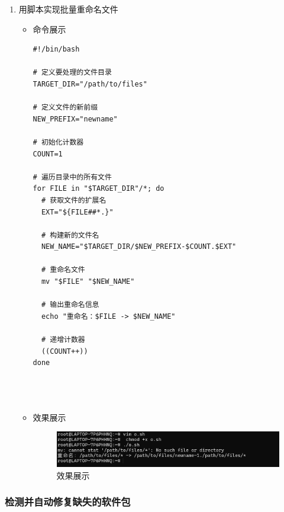 \documentclass[UTF8]{ctexart}
\begin{document}
\begin{enumerate}
  \item 用脚本实现批量重命名文件

  \begin{itemize}
  \item 命令展示
  \begin{verbatim}
#!/bin/bash

# 定义要处理的文件目录
TARGET_DIR="/path/to/files"

# 定义文件的新前缀
NEW_PREFIX="newname"

# 初始化计数器
COUNT=1

# 遍历目录中的所有文件
for FILE in "$TARGET_DIR"/*; do
  # 获取文件的扩展名
  EXT="${FILE##*.}"
  
  # 构建新的文件名
  NEW_NAME="$TARGET_DIR/$NEW_PREFIX-$COUNT.$EXT"
  
  # 重命名文件
  mv "$FILE" "$NEW_NAME"
  
  # 输出重命名信息
  echo "重命名：$FILE -> $NEW_NAME"
  
  # 递增计数器
  ((COUNT++))
done


    
  \end{verbatim}

  \item 效果展示
  \begin{figure}[H]
    \centering
    \includegraphics[width=\textwidth]{7} %
    \caption{效果展示}
  
  \end{figure}
\end{itemize}
\end{enumerate}
\subsubsection{检测并自动修复缺失的软件包}
\end{document}
